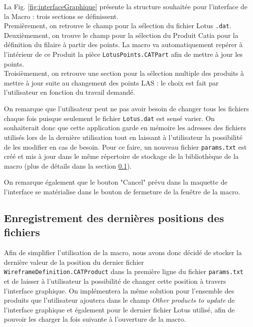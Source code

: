 \par La Fig. \ref{fig:interfaceGraphique} présente la structure souhaitée pour l'interface de la Macro : trois sections se définissent. \\
Premièrement, on retrouve le champ pour la sélection du fichier Lotus \texttt{.dat}.\\
Deuxièmement, on trouve le champ pour la sélection du Produit Catia pour la définition du filaire à partir des points. La macro va automatiquement repérer à l'intérieur de ce Produit la pièce \texttt{LotusPoints.CATPart} afin de mettre à jour les points. \\
Troisièmement, on retrouve une section pour la sélection multiple des produits à mettre à jour suite au changement des points LAS : le choix est fait par l'utilisateur en fonction du travail demandé.

\par On remarque que l'utilisateur peut ne pas avoir besoin de changer tous les fichiers chaque fois puisque seulement le fichier \texttt{Lotus.dat} est sensé varier. On souhaiterait donc que cette application garde en mémoire les adresses des fichiers utilisés lors de la dernière utilisation tout en laissant à l'utilisateur la possibilité de les modifier en cas de besoin. Pour ce faire, un nouveau fichier \texttt{params.txt} est créé et mis à jour dans le même répertoire de stockage de la bibliothèque de la macro (plus de détails dans la section \ref{enregistrement_last_position}).

\par On remarque également que le bouton "Cancel" prévu dans la maquette de l'interface se matérialise dans le bouton de fermeture de la fenêtre de la macro.


\subsection{Enregistrement des dernières positions des fichiers} %
\label{enregistrement_last_position}

\par Afin de simplifier l'utilisation de la macro, nous avons donc décidé de stocker la dernière valeur de la position du dernier fichier \texttt{WireframeDefinition.CATProduct} dans la première ligne du fichier \texttt{params.txt} et de laisser à l'utilisateur la possibilité de changer cette position à travers l'interface graphique. On implémentera la même solution pour l'ensemble des produits que l'utilisateur ajoutera dans le champ \textit{Other products to update} de l'interface graphique et également pour le dernier fichier Lotus utilisé, afin de pouvoir les charger la fois suivante à l'ouverture de la macro.

